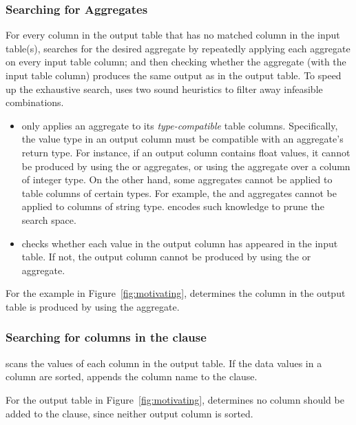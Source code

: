
\subsubsection{Searching for Aggregates}
\label{sec:agg_search}

For every column in the output table that has no matched
column in the input table(s),
\ourtool searches for the desired aggregate by
repeatedly applying each aggregate on
every input table column; and then checking whether
the aggregate (with the input table column) produces the same output 
as in the output table. To speed up the exhaustive search,
\ourtool uses two sound heuristics to filter away infeasible
combinations.


\begin{itemize}
\item \ourtool only applies an aggregate
to its \textit{type-compatible} table columns. Specifically,
the value type in an output column must be compatible with an
aggregate's return type. For instance, if an output column
contains float values, it cannot be produced by using the 
or  aggregates, or 
using the  aggregate over a column of integer type.
On the other hand, some aggregates cannot be applied to
table columns of certain types. For example, the 
and  aggregates cannot be applied to columns of string type.
\ourtool encodes such knowledge to prune the search space.

\item \ourtool checks whether each value in the output
column has appeared in the input table. If not, the
output column cannot be produced by using
the  or  aggregate.
\end{itemize}

For the example in Figure~\ref{fig:motivating}, \ourtool
determines the  column in the output
table is produced by using the  aggregate.



\subsubsection{Searching for columns in the  clause}
\label{sec:orderby}
\ourtool scans the values of each column in the output table. If
the data values in a column are sorted, \ourtool
appends the column name to the  clause.

For the output table in Figure~\ref{fig:motivating}, \ourtool
determines no column should be added to the  clause,
since neither output column is sorted.

